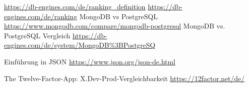 \begin{thebibliography}{HR08}
         \url{https://db-engines.com/de/ranking_definition}
         \url{https://db-engines.com/de/ranking}
         MongoDB vs PostgreSQL \url{https://www.mongodb.com/compare/mongodb-postgresql}
         MongoDB vs. PostgreSQL Vergleich \url{https://db-engines.com/de/system/MongoDB%3BPostgreSQ}
        
         Einführung in JSON \url{https://www.json.org/json-de.html}

        The Twelve-Factor-App: X.Dev-Prod-Vergleichbarkeit \url{https://12factor.net/de/}

        
        




     \end{thebibliography}